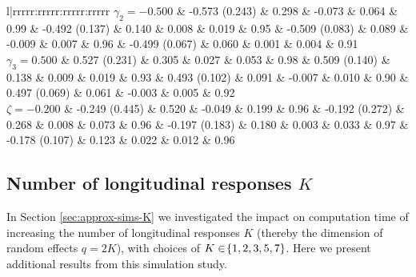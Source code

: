\begin{landscape}
\begin{table}[ht]
\begin{tabular}{l|rrrrr:rrrrr:rrrrr:rrrrr}
  $\gamma_2 = -0.500$ & -0.573 (0.243) & 0.298 & -0.073 & 0.064 & 0.99 & -0.492 (0.137) & 0.140 &  0.008 & 0.019 & 0.95 & -0.509 (0.083) & 0.089 & -0.009 & 0.007 & 0.96 & -0.499 (0.067) & 0.060 &  0.001 & 0.004 & 0.91 \\ 
  $\gamma_3 = 0.500$ &  0.527 (0.231) & 0.305 &  0.027 & 0.053 & 0.98 &  0.509 (0.140) & 0.138 &  0.009 & 0.019 & 0.93 &  0.493 (0.102) & 0.091 & -0.007 & 0.010 & 0.90 &  0.497 (0.069) & 0.061 & -0.003 & 0.005 & 0.92 \\ 
  $\zeta = -0.200$ & -0.249 (0.445) & 0.520 & -0.049 & 0.199 & 0.96 & -0.192 (0.272) & 0.268 &  0.008 & 0.073 & 0.96 & -0.197 (0.183) & 0.180 &  0.003 & 0.033 & 0.97 & -0.178 (0.107) & 0.123 &  0.022 & 0.012 & 0.96 \\ 
   \hline
\end{tabular}
\endgroup
\caption{Parameter estimates for differing sample sizes $n\in\lbr100,250,500,1000\rbr$. `Mean (SD)' denotes the average estimated value with standard deviation of the parameter estimate. `SE' denotes the mean standard error calculated at each model fit. Coverage probabilities are calculated from $\hbO\pm1.96\mathrm{SE}(\hbO)$ Median [IQR] elapsed time taken for approximate EM algorithm to converge and standard error calculation for $n=100$ was 1.799 [1.452, 2.479] seconds and total computation time was 3.015 [2.651, 3.761] seconds; for $n=250$ was 3.553 [3.314, 3.769] seconds total computation time was 5.348 [5.075, 5.724] seconds; for $n=500$ was 8.525 [8.243, 8.886] seconds and total computation time was 11.395 [11.047, 11.976] seconds; and for $n=1000$ was 26.962 [26.193, 27.591] seconds and total computation time was 32.907 [31.979, 33.530] seconds.} 
\label{tab:approx-sims-n}
\end{table}
\vfill
\lscapepageno
\end{landscape}
\restoregeometry
\clearpage

\subsection{Number of longitudinal responses \texorpdfstring{$K$}{K}}\label{sec:appendix-MVJMresults-K}
In Section \ref{sec:approx-sims-K} we investigated the impact on computation time of increasing the number of longitudinal responses $K$ (thereby the dimension of random effects $q=2K$), with choices of $K\in\!\left\{1,2,3,5,7\right\}$. Here we present additional results from this simulation study. 

